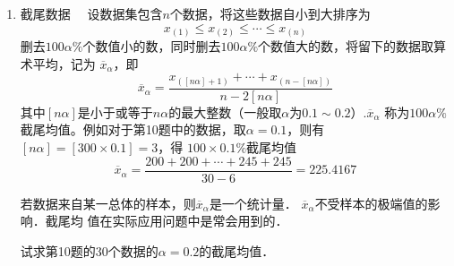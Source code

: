 \documentclass[10pt,a4paper]{article}
\begin{document}
\begin{enumerate}
    \item {\heiti 截尾数据}$\quad$ 设数据集包含$n$个数据，将这些数据自小到大排序为
    $$x_{(1)}\leq x_{(2)} \leq \cdots \leq x_{(n)}$$
    删去$100\alpha \%$个数值小的数，同时删去$100\alpha \%$个数值大的数，将留下的数据取算术平均，记为
    $\overline{x}_\alpha$，即
    $$\overline{x}_\alpha=\frac{x_{([n\alpha]+1)}+\cdots+x_{(n-[n\alpha])}}{n-2[n\alpha]}$$
    其中$[n\alpha]$是小于或等于$n\alpha$的最大整数（一般取$\alpha$为$0.1\sim 0.2$）.$\overline{x}_\alpha$
    称为$100\alpha\%$截尾均值。例如对于第10题中的数据，取$\alpha=0.1$，则有$[n\alpha]=[300\times 0.1]=3$，得
    $100\times 0.1\%$截尾均值
    $$\overline{x}_\alpha=\frac{200+200+\cdots+245+245}{30-6}=225.4167$$
    \par 若数据来自某一总体的样本，则$\overline{x}_\alpha$是一个统计量． $\overline{x}_\alpha$不受样本的极端值的影响．截尾均
    值在实际应用问题中是常会用到的．
    \par 试求第10题的30个数据的$\alpha=0.2$的截尾均值．
    

    


  

\end{enumerate}
\end{document}
